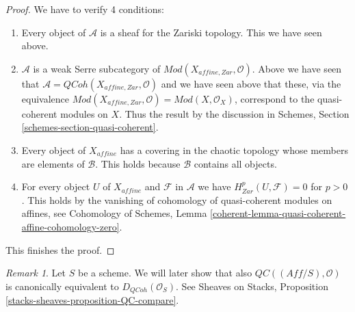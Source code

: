 \documentclass{stacks-project}
\theoremstyle{plain}
\theoremstyle{definition}
\theoremstyle{remark}
\newtheorem{remark}[subsection]{Remark}
\numberwithin{equation}{subsection}
\def\QCoh{\mathit{QCoh}}
\begin{document}
\begin{proof}
\medskip\noindent
We have to verify 4 conditions:
\begin{enumerate}
\item Every object of $\mathcal{A}$ is a sheaf for the Zariski topology.
This we have seen above.
\item $\mathcal{A}$ is a weak Serre subcategory of
$\textit{Mod}(X_{affine, Zar}, \mathcal{O})$. Above we have
seen that $\mathcal{A} = \QCoh(X_{affine, Zar}, \mathcal{O})$ and
we have seen above that these,
via the equivalence $\textit{Mod}(X_{affine, Zar}, \mathcal{O}) =
\textit{Mod}(X, \mathcal{O}_X)$, correspond to the quasi-coherent modules
on $X$. Thus the result by the discussion in
Schemes, Section \ref{schemes-section-quasi-coherent}.
\item Every object of $X_{affine}$ has a covering in the chaotic
topology whose members are elements of $\mathcal{B}$. This holds
because $\mathcal{B}$ contains all objects.
\item For every object $U$ of $X_{affine}$ and $\mathcal{F}$ in $\mathcal{A}$
we have $H^p_{Zar}(U, \mathcal{F}) = 0$ for $p > 0$.
This holds by the vanishing of cohomology of quasi-coherent modules
on affines, see
Cohomology of Schemes, Lemma
\ref{coherent-lemma-quasi-coherent-affine-cohomology-zero}.
\end{enumerate}
This finishes the proof.
\end{proof}

\begin{remark}
\label{remark-QC-compare}
Let $S$ be a scheme. We will later show that also
$\mathit{QC}((\textit{Aff}/S), \mathcal{O})$
is canonically equivalent to $D_\QCoh(\mathcal{O}_S)$.
See Sheaves on Stacks, Proposition \ref{stacks-sheaves-proposition-QC-compare}.
\end{remark}












\end{document}
